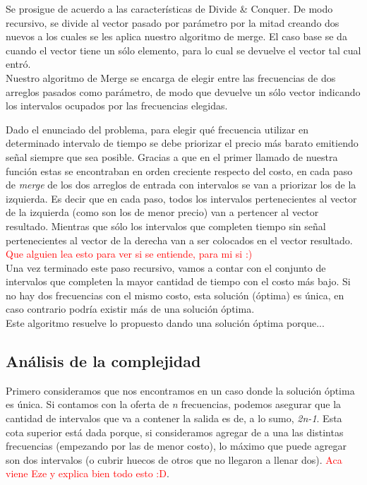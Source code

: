 \documentclass[a4paper]{article}
\begin{document}
Se prosigue de acuerdo a las características de Divide \& Conquer. De modo recursivo, se divide al vector pasado por parámetro por la mitad creando dos nuevos a los cuales se les aplica nuestro algoritmo de merge. El caso base se da cuando el vector tiene un sólo elemento, para lo cual se devuelve el vector tal cual entró.\\

Nuestro algoritmo de Merge se encarga de elegir entre las frecuencias de dos arreglos pasados como parámetro, de modo que devuelve un sólo vector indicando los intervalos ocupados por las frecuencias elegidas. 

Dado el enunciado del problema, para elegir qu\'e frecuencia utilizar en determinado intervalo de tiempo se debe priorizar el precio más barato emitiendo señal siempre que sea posible. Gracias a que en el primer llamado de nuestra funci\'on estas se encontraban en orden creciente respecto del costo, en cada paso de \emph{merge} de los dos arreglos de entrada con intervalos se van a priorizar los de la izquierda. Es decir que en cada paso, todos los intervalos pertenecientes al vector de la izquierda (como son los de menor precio) van a pertencer al vector resultado. Mientras que s\'olo los intervalos que completen tiempo sin se\~nal pertenecientes al vector de la derecha van a ser colocados en el vector resultado. \textcolor{red}{Que alguien lea esto para ver si se entiende, para mi si :)}\\

Una vez terminado este paso recursivo, vamos a contar con el conjunto de intervalos que completen la mayor cantidad de tiempo con el costo m\'as bajo. Si no hay dos frecuencias con el mismo costo, esta soluci\'on (\'optima) es \'unica, en caso contrario podr\'ia existir m\'as de una soluci\'on \'optima. \\


Este algoritmo resuelve lo propuesto dando una soluci\'on \'optima porque...\\ 




\newpage

\subsection{An\'alisis de la complejidad}

Primero consideramos que nos encontramos en un caso donde la soluci\'on \'optima es \'unica. Si contamos con la oferta de \emph{n} frecuencias, podemos asegurar que la cantidad de intervalos que va a contener la salida es de, a lo sumo, \emph{2n-1}. Esta cota superior est\'a dada porque, si consideramos agregar de a una las distintas frecuencias (empezando por las de menor costo), lo m\'aximo que puede agregar son dos intervalos (o cubrir huecos de otros que no llegaron a llenar dos). \textcolor{red}{Aca viene Eze y explica bien todo esto :D}.
\end{document}
